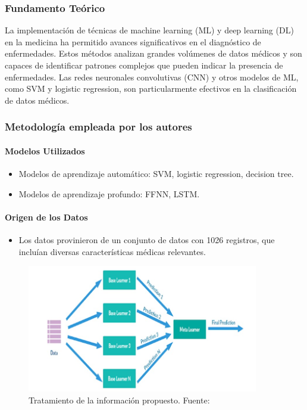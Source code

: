 \subsubsection{Fundamento Teórico}

La implementación de técnicas de machine learning (ML) y deep learning (DL) en la medicina ha permitido avances significativos en el diagnóstico de enfermedades. Estos métodos analizan grandes volúmenes de datos médicos y son capaces de identificar patrones complejos que pueden indicar la presencia de enfermedades. Las redes neuronales convolutivas (CNN) y otros modelos de ML, como SVM y logistic regression, son particularmente efectivos en la clasificación de datos médicos.

\subsubsection{Metodología empleada por los autores}

\paragraph{Modelos Utilizados}

\begin{itemize}
\item Modelos de aprendizaje automático: SVM, logistic regression, decision tree.
\item Modelos de aprendizaje profundo: FFNN, LSTM.
\end{itemize}

\paragraph{Origen de los Datos}

\begin{itemize}
\item Los datos provinieron de un conjunto de datos con 1026 registros, que incluían diversas características médicas relevantes.
\end{itemize}

\begin{figure}[H]
    \centering
    \includegraphics[width=0.9\textwidth]{images_repo/stacking.jpg}
    \caption{Tratamiento de la información propuesto. Fuente: \cite{jiang2020heart}}
    \label{Tratamiento de la información propuesto}
\end{figure}

